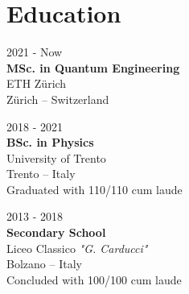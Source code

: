 \documentclass[a4paper,10pt]{article}
\begin{document}
\begin{adjustbox}{valign=t}
\begin{minipage}{0.3\textwidth}
\vfill

\section*{Education}
	\begin{description}
	\raggedright
	\item []\normalfont \textcolor{ColorTwo}{2021 - Now}\\
    \textbf{MSc. in Quantum Engineering}\\
	ETH Zürich\\
	Zürich -- Switzerland

	\item []\normalfont \textcolor{ColorTwo}{2018 - 2021}\\ \textbf{BSc. in
	Physics}\\
	University of Trento\\
	Trento -- Italy\\
    \small{Graduated with 110/110 cum laude}
    \normalsize

	\item []\normalfont \textcolor{ColorTwo}{2013 - 2018}\\
	\textbf{Secondary School}\\ 
	Liceo Classico \textit{"G. Carducci"} \\
	Bolzano -- Italy \\
    \small{Concluded with 100/100 cum laude} \normalsize
\end{description}

\end{minipage}
\end{adjustbox}
%
%
%
\hfill
\begin{adjustbox}{valign=t}
\begin{minipage}{0.05\textwidth} %
\MyVerticalRule  %
\end{minipage}
\end{adjustbox}
%
\end{document}
